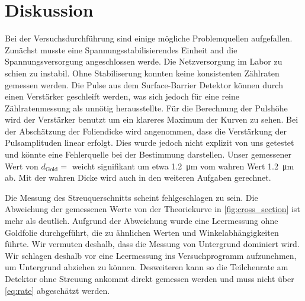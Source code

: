 \section{Diskussion}

Bei der Versuchsdurchführung sind einige mögliche Problemquellen aufgefallen.
Zunächst musste eine Spannungsstabilisierendes Einheit and die Spannungsversorgung angeschlossen werde.
Die Netzversorgung im Labor zu schien zu instabil. Ohne Stabiliserung konnten keine konsistenten Zählraten gemessen werden.
Die Pulse aus dem Surface-Barrier Detektor können durch einen Verstärker geschleift werden, was sich jedoch für eine reine Zählratenmessung
als unnötig herausstellte.
Für die Berechnung der Pulshöhe wird der Verstärker benutzt um ein klareres Maximum der Kurven zu sehen.
Bei der Abschätzung der Foliendicke wird angenommen, dass die Verstärkung der Pulsamplituden linear erfolgt.
Dies wurde jedoch nicht explizit von uns getestet und könnte eine Fehlerquelle bei der Bestimmung darstellen.
Unser gemessener Wert von $d_\text{Gold} = $ weicht signifikant um etwa \SI{1.2}{\micro\meter} vom wahren Wert \SI{1.2}{\micro\meter} ab.
Mit der wahren Dicke wird auch in den weiteren Aufgaben gerechnet.

Die Messung des Streuquerschnitts scheint fehlgeschlagen zu sein. Die Abweichung der gemessenen Werte von der Theoriekurve in \autoref{fig:cross_section} ist mehr als deutlich.
Aufgrund der Abweichung wurde eine Leermessung ohne Goldfolie durchgeführt, die zu ähnlichen Werten und Winkelabhängigkeiten führte.
Wir vermuten deshalb, dass  die Messung von Untergrund dominiert wird.
Wir schlagen deshalb vor eine Leermessung ins Versuchprogramm aufzunehmen, um Untergrund abziehen zu können.
Desweiteren kann so die Teilchenrate am Detektor ohne Streuung ankommt direkt gemessen werden und muss nicht über \eqref{eq:rate} abgeschätzt werden.
